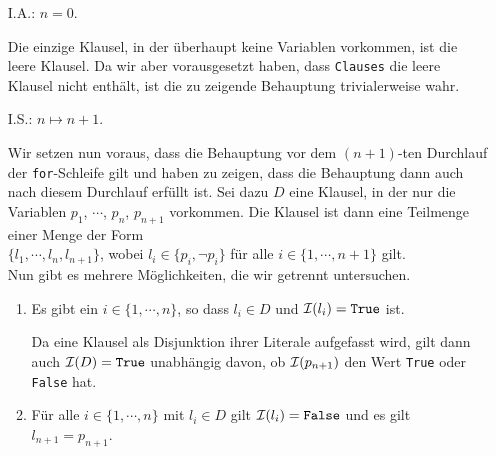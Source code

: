 \begin{enumerate}
\item[I.A.:] $n = 0$.

             Die einzige Klausel, in der überhaupt keine Variablen vorkommen, ist die leere Klausel.
             Da wir aber vorausgesetzt haben, dass \texttt{Clauses} die leere Klausel nicht enthält,
             ist die zu zeigende Behauptung tri\-vialerweise wahr.
\item[I.S.:] $n \mapsto n+1$.

             Wir setzen nun voraus, dass die Behauptung vor dem $(n\!+\!1)$-ten Durchlauf der
             \texttt{for}-Schleife gilt und haben zu zeigen, dass die Behauptung dann auch nach
             diesem Durchlauf erfüllt ist.  Sei dazu $D$ eine Klausel, in der nur die Variablen
             $p_1$, $\cdots$, $p_n$, $p_{n+1}$ vorkommen.  Die Klausel ist dann eine Teilmenge einer
             Menge der Form
             \\[0.2cm]
             \hspace*{1.3cm}
             $\{ l_1, \cdots, l_n, l_{n+1} \}$, \quad wobei $l_i \in \{ p_i, \neg p_i \}$ für alle
             $i \in \{1,\cdots, n+1\}$ gilt.
             \\[0.2cm]
             Nun gibt es mehrere Möglichkeiten, die wir getrennt untersuchen.
             \begin{enumerate}
             \item Es gibt ein $i \in \{1,\cdots,n\}$, so dass $l_i \in D$ und  $\mathcal{I}(l_i) =
               \texttt{True}$ ist.  

                   Da eine Klausel als Disjunktion ihrer Literale aufgefasst wird, gilt dann auch
                   $\mathcal{I}(D) = \texttt{True}$ unabhängig davon, ob $\mathcal{I}(p_{n+1})$ den Wert \texttt{True} oder
                   \texttt{False} hat.
             \item Für alle $i \in \{1,\cdots,n\}$ mit $l_i \in D$ gilt $\mathcal{I}(l_i) = \texttt{False}$ und es gilt $l_{n+1} = p_{n+1}$.
                   

\end{enumerate}
\end{enumerate}

